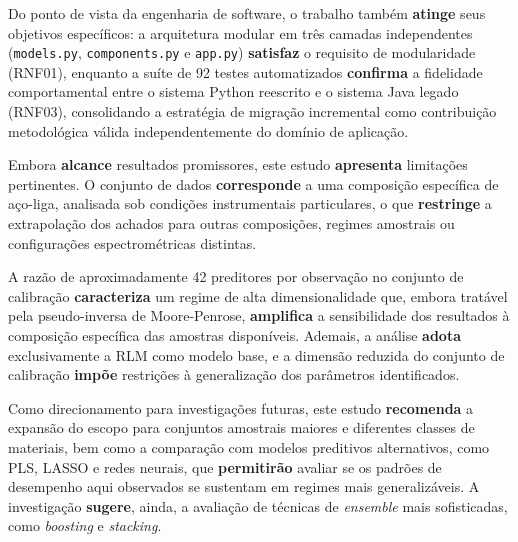Do ponto de vista da engenharia de software, o trabalho também \textbf{atinge} seus
objetivos específicos: a arquitetura modular em três camadas independentes
(\texttt{models.py}, \texttt{components.py} e \texttt{app.py}) \textbf{satisfaz} o
requisito de modularidade (RNF01), enquanto a suíte de 92 testes automatizados
\textbf{confirma} a fidelidade comportamental entre o sistema Python reescrito e o
sistema Java legado (RNF03), consolidando a estratégia de migração incremental como
contribuição metodológica válida independentemente do domínio de aplicação.

Embora \textbf{alcance} resultados promissores, este estudo 
\textbf{apresenta} limitações pertinentes. O conjunto de dados 
\textbf{corresponde} a uma composição específica de aço-liga, analisada 
sob condições instrumentais particulares, o que \textbf{restringe} a 
extrapolação dos achados para outras composições, regimes amostrais ou 
configurações espectrométricas distintas. %

A razão de aproximadamente 42 preditores por observação no conjunto de 
calibração \textbf{caracteriza} um regime de alta dimensionalidade que, 
embora tratável pela pseudo-inversa de Moore-Penrose, \textbf{amplifica} 
a sensibilidade dos resultados à composição específica das amostras 
disponíveis. %
Ademais, a análise \textbf{adota} exclusivamente a RLM 
como modelo base, e a dimensão reduzida do conjunto de calibração 
\textbf{impõe} restrições à generalização dos parâmetros identificados.

Como direcionamento para investigações futuras, este estudo 
\textbf{recomenda} a expansão do escopo para conjuntos amostrais maiores 
e diferentes classes de materiais, bem como a comparação com modelos 
preditivos alternativos, como \gls{PLS}, \gls{LASSO} e redes neurais, 
que \textbf{permitirão} avaliar se os padrões de desempenho aqui 
observados se sustentam em regimes mais generalizáveis. %
A investigação \textbf{sugere}, ainda, a avaliação de 
técnicas de \textit{ensemble} mais sofisticadas, como \textit{boosting} 
e \textit{stacking}.


